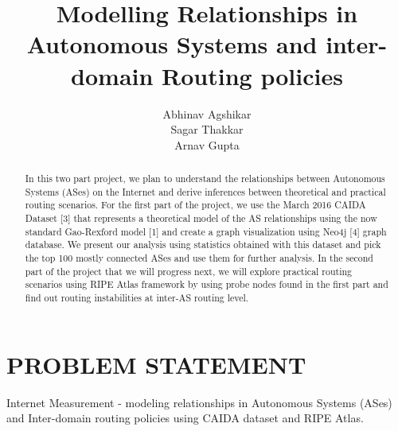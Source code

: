 \documentclass{sig-alternate-05-2015}
\begin{document}

\title{Modelling Relationships in Autonomous Systems and inter-domain Routing policies}

%
\author{
%
%
\alignauthor Abhinav Agshikar\\
\alignauthor
Sagar Thakkar\\
\alignauthor
Arnav Gupta\\
}


\maketitle
\section*{PROBLEM STATEMENT}
Internet Measurement - modeling relationships in Autonomous Systems (ASes) and Inter-domain routing policies using CAIDA dataset and RIPE Atlas. 

\begin{abstract}
In this two part project, we plan to understand the relationships between Autonomous Systems (ASes) on the Internet and derive inferences
between theoretical and practical routing scenarios. For the first part of the project, we use the March 2016 CAIDA Dataset  [3] that 
represents a theoretical model of the AS relationships using the now standard Gao-Rexford model  [1] and create
a graph visualization using Neo4j [4] graph database. We present our analysis using statistics obtained with this dataset and pick the top 100
mostly connected ASes and use them for further analysis. In the second part  of the project that we will progress next,
we will explore practical routing scenarios using RIPE Atlas framework by using probe nodes found in the first part and find out routing
instabilities at inter-AS routing level.

\end{abstract}
\end{document}
